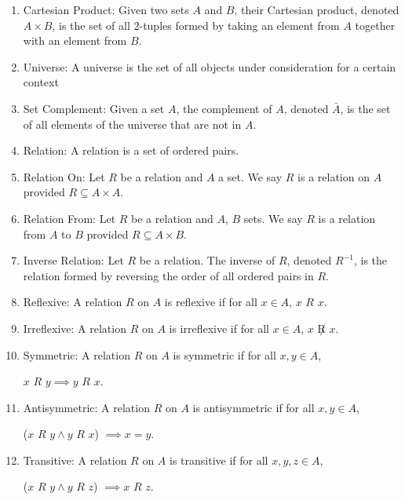 \documentclass{article}
\begin{document}
\begin{enumerate}
		\item Cartesian Product: Given two sets $A$ and $B$, their Cartesian product, denoted $A\times B$,
		is the set of all 2-tuples formed by taking an element from $A$ together with an element from $B$.
		
		\item Universe: A universe is the set of all objects under consideration for a certain context
		
		\item Set Complement: Given a set $A$, the complement of $A$, denoted $\bar A$, is the set of all elements of the universe that are not in $A$.
		
		\item Relation: A relation is a set of ordered pairs.
		
		\item Relation On: Let $R$ be a relation and $A$ a set.
		We say $R$ is a relation on $A$ provided $R\subseteq A\times A$.
		
		\item Relation From: Let $R$ be a relation and $A$, $B$ sets.
		We say $R$ is a relation from $A$ to $B$ provided $R\subseteq A\times B$.
		
		\item Inverse Relation: Let $R$ be a relation.
		The inverse of $R$, denoted $R^{-1}$, is the relation formed by reversing the order of all ordered pairs in $R$.
		
		\item Reflexive: A relation $R$ on $A$ is reflexive if for all $x\in A$, $x$ $R$ $x$.
		
		\item Irreflexive: A relation $R$ on $A$ is irreflexive if for all $x\in A$, $x$ $\not R$ $x$.
		
		\item Symmetric: A relation $R$ on $A$ is symmetric if for all $x,y\in A$,
		
		$x$ $R$ $y\implies y$ $R$ $x$.
		
		\item Antisymmetric: A relation $R$ on $A$ is antisymmetric if for all $x,y\in A$,
		
		($x$ $R$ $y\wedge y$ $R$ $x$) $\implies x=y$.
		
		\item Transitive: A relation $R$ on $A$ is transitive if for all $x,y,z\in A$,
		
		($x$ $R$ $y\wedge y$ $R$ $z$) $\implies x$ $R$ $z$.
		

\end{enumerate}
\end{document}
